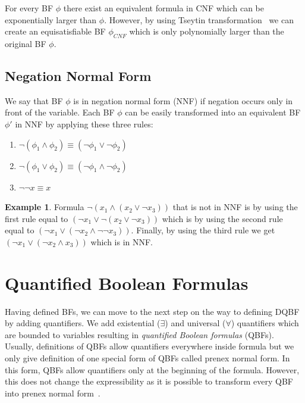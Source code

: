 \documentclass[
  digital, %
  twoside, %
  table,   %
  nolof,     %
  nolot,     %
]{fithesis3}
\theoremstyle{definition}
\newtheorem{example}{Example}
\theoremstyle{remark}
\begin{document}
For every BF $\phi$ there exist an equivalent formula in CNF which can be exponentially larger than $\phi$. However, by using Tseytin transformation~\cite{Tseitin} we can create an equisatisfiable BF $\phi_{CNF}$ which is only polynomially larger than the original BF $\phi$.

\subsection{Negation Normal Form}
\label{sec:BF:NNF}
We say that BF $\phi$ is in negation normal form (NNF) if negation occurs only in front of the variable. Each BF $\phi$ can be easily transformed into an equivalent BF $\phi'$ in NNF by applying these three rules:
\begin{enumerate}
    \item $\neg(\phi_1 \land \phi_2) \equiv (\neg\phi_1 \lor \neg\phi_2)$ 
    \item $\neg(\phi_1 \lor \phi_2) \equiv (\neg\phi_1 \land \neg\phi_2)$
    \item $\neg\neg x \equiv x$
\end{enumerate}
\begin{example}
Formula $\neg (x_1 \land (x_2 \lor \neg x_3))$ that is not in NNF is by using the first rule equal to $(\neg x_1 \lor \neg(x_2 \lor \neg x_3))$ which is by using the second rule equal to $(\neg x_1 \lor (\neg x_2 \land \neg\neg x_3))$. Finally, by using the third rule we get $(\neg x_1 \lor (\neg x_2 \land x_3))$ which is in NNF.
\end{example}

\section{Quantified Boolean Formulas}
Having defined BFs, we can move to the next step on the way to defining DQBF by adding quantifiers. We add existential (${\exists}$) and universal (${\forall}$) quantifiers which are bounded to variables resulting in \emph{quantified Boolean formulas} (QBFs). Usually, definitions of QBFs allow quantifiers everywhere inside formula but we only give definition of one special form of QBFs called prenex normal form. In this form, QBFs allow quantifiers only at the beginning of the formula. However, this does not change the expressibility as it is possible to transform every QBF into prenex normal form~\cite{prenexingQBFs}.
\end{document}

